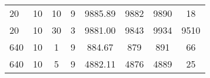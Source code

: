 \begin{table}[H]
\begin{tabular}{l|ccccccc}
 20                                                                   & 10                                                                                                                                                             & 10                                                                                                                               & 9                                                                                                                                                              & 9885.89                                                                                                                          & 9882                         & 9890                         & 18                                                                   \\
 20                                                                   & 10                                                                                                                                                             & 30                                                                                                                               & 3                                                                                                                                                              & 9881.00                                                                                                                          & 9843                         & 9934                         & 9510                                                                 \\
 640                                                                  & 10                                                                                                                                                             & 1                                                                                                                                & 9                                                                                                                                                              & 884.67                                                                                                                           & 879                          & 891                          & 66                                                                   \\
 640                                                                  & 10                                                                                                                                                             & 5                                                                                                                                & 9                                                                                                                                                              & 4882.11                                                                                                                          & 4876                         & 4889                         & 25                                                                   \\

\end{tabular}
\end{table}
